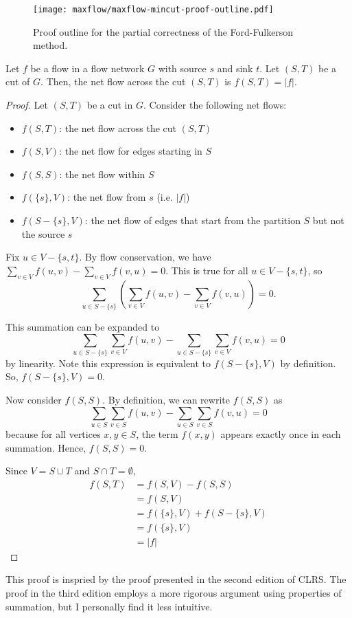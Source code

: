 \begin{figure}[htbp]
    \centering
    \texttt{[image: maxflow/maxflow-mincut-proof-outline.pdf]}
    \hfill
    \caption{Proof outline for the partial correctness of the Ford-Fulkerson method.}
    \label{fig:maxflow-ford-fulkerson-proof}
\end{figure}

\begin{lemma} \label{lem:flow-across-cut}
    Let $f$ be a flow in a flow network $G$ with source $s$ and sink $t$. Let $(S,T)$ be a cut of $G$. Then, the net flow across the cut $(S,T)$ is $f(S,T) = |f|$.
\end{lemma}

\begin{proof}
    Let $(S,T)$ be a cut in $G$. Consider the following net flows:
    \begin{itemize}
        \item $f(S,T)$: the net flow across the cut $(S,T)$ 
        \item $f(S,V)$: the net flow for edges starting in $S$
        \item $f(S,S)$: the net flow within $S$ 
        \item $f(\{s\},V)$: the net flow from $s$ (i.e. $|f|$)
        \item $f(S-\{s\},V)$: the net flow of edges that start from the partition $S$ but not the source $s$ 
    \end{itemize}
    Fix $u \in V - \{s,t\}$. By flow conservation, we have $\sum_{v \in V} f(u,v) - \sum_{v \in V} f(v,u) = 0$. This is true for all $u \in V - \{s,t\}$, so 
    $$\sum_{u \in S-\{s\}} \left(\sum_{v \in V} f(u,v) - \sum_{v \in V} f(v,u)\right) = 0.$$ 
    
    This summation can be expanded to 
    $$\sum_{u \in S-\{s\}}\sum_{v \in V} f(u,v) - \sum_{u \in S-\{s\}}\sum_{v \in V} f(v,u) = 0$$
    by linearity. Note this expression is equivalent to $f(S-\{s\},V)$ by definition. So, $f(S-\{s\},V) = 0$.

    Now consider $f(S,S)$. By definition, we can rewrite $f(S,S)$ as 
    $$\sum_{u \in S}\sum_{v \in S} f(u,v) - \sum_{u \in S}\sum_{v \in S} f(v,u) = 0$$
    because for all vertices $x,y \in S$, the term $f(x,y)$ appears exactly once in each summation. Hence, $f(S,S) = 0$.

    Since $V = S \cup T$ and $S \cap T = \emptyset$,
    $$
    \begin{aligned}
        f(S,T) &= f(S,V) - f(S,S) \\
        &= f(S,V) \\
        &= f(\{s\},V) + f(S-\{s\},V) \\
        &= f(\{s\},V) \\
        &= |f|
    \end{aligned}
    $$ 
\end{proof}
This proof is inspried by the proof presented in the second edition of CLRS. The proof in the third edition employs a more rigorous argument using properties of summation, but I personally find it less intuitive.

